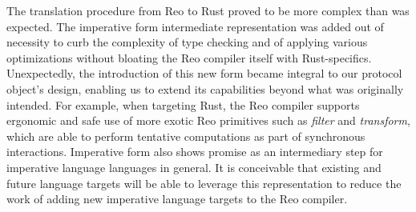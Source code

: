 The translation procedure from Reo to Rust
proved to be more complex than was expected. The imperative form intermediate representation was added out of necessity to curb the complexity of type checking and of applying various optimizations without bloating the Reo compiler itself with Rust-specifics. Unexpectedly, the introduction of this new form became integral to our protocol object's design, enabling us to extend its capabilities beyond what was originally intended. For example, when targeting Rust, the Reo compiler supports ergonomic and safe use of more exotic Reo primitives such as \textit{filter} and \textit{transform}, which are able to perform tentative computations as part of synchronous interactions. Imperative form also shows promise as an intermediary step for imperative language languages in general. It is conceivable that existing and future language targets will be able to leverage this representation to reduce the work of adding new imperative language targets to the Reo compiler. 

